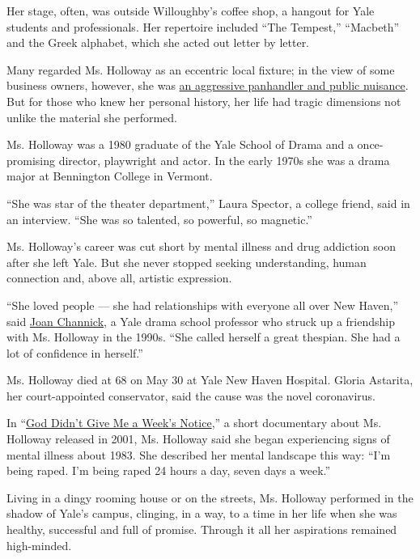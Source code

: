 Her stage, often, was outside Willoughby's coffee shop, a hangout for
Yale students and professionals. Her repertoire included ``The
Tempest,'' ``Macbeth'' and the Greek alphabet, which she acted out
letter by letter.

Many regarded Ms. Holloway as an eccentric local fixture; in the view of
some business owners, however, she was
\href{https://www.nytimes3xbfgragh.onion/2004/12/19/nyregion/a-resurgent-downtown-wearies-of-a-street-poets-antic-disposition.html}{an
aggressive panhandler and public nuisance}. But for those who knew her
personal history, her life had tragic dimensions not unlike the material
she performed.

Ms. Holloway was a 1980 graduate of the Yale School of Drama and a
once-promising director, playwright and actor. In the early 1970s she
was a drama major at Bennington College in Vermont.

``She was star of the theater department,'' Laura Spector, a college
friend, said in an interview. ``She was so talented, so powerful, so
magnetic.''

Ms. Holloway's career was cut short by mental illness and drug addiction
soon after she left Yale. But she never stopped seeking understanding,
human connection and, above all, artistic expression.

``She loved people --- she had relationships with everyone all over New
Haven,'' said \href{https://www.drama.yale.edu/bios/joan-channick/}{Joan
Channick}, a Yale drama school professor who struck up a friendship with
Ms. Holloway in the 1990s. ``She called herself a great thespian. She
had a lot of confidence in herself.''

Ms. Holloway died at 68 on May 30 at Yale New Haven Hospital. Gloria
Astarita, her court-appointed conservator, said the cause was the novel
coronavirus.

In ``\href{http://www.afterart.com/holloway.html}{God Didn't Give Me a
Week's Notice},'' a short documentary about Ms. Holloway released in
2001, Ms. Holloway said she began experiencing signs of mental illness
about 1983. She described her mental landscape this way: ``I'm being
raped. I'm being raped 24 hours a day, seven days a week.''

Living in a dingy rooming house or on the streets, Ms. Holloway
performed in the shadow of Yale's campus, clinging, in a way, to a time
in her life when she was healthy, successful and full of promise.
Through it all her aspirations remained high-minded.

